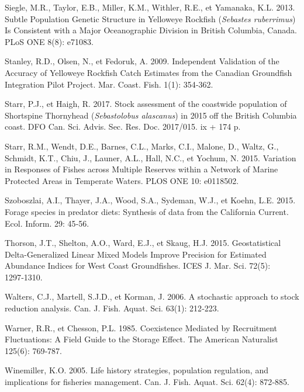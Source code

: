 \documentclass[french,11pt]{book}
\begin{document}
\leavevmode\hypertarget{ref-siegle2013}{}%
Siegle, M.R., Taylor, E.B., Miller, K.M., Withler, R.E., et Yamanaka, K.L. 2013. Subtle Population Genetic Structure in Yelloweye Rockfish (\emph{Sebastes ruberrimus}) Is Consistent with a Major Oceanographic Division in British Columbia, Canada. PLoS ONE 8(8): e71083.

\leavevmode\hypertarget{ref-stanley2009}{}%
Stanley, R.D., Olsen, N., et Fedoruk, A. 2009. Independent Validation of the Accuracy of Yelloweye Rockfish Catch Estimates from the Canadian Groundfish Integration Pilot Project. Mar. Coast. Fish. 1(1): 354‑362.

\leavevmode\hypertarget{ref-starr2017}{}%
Starr, P.J., et Haigh, R. 2017. Stock assessment of the coastwide population of Shortspine Thornyhead (\emph{Sebastolobus alascanus}) in 2015 off the British Columbia coast. DFO Can. Sci. Advis. Sec. Res. Doc. 2017/015. ix + 174 p.

\leavevmode\hypertarget{ref-starr2015}{}%
Starr, R.M., Wendt, D.E., Barnes, C.L., Marks, C.I., Malone, D., Waltz, G., Schmidt, K.T., Chiu, J., Launer, A.L., Hall, N.C., et Yochum, N. 2015. Variation in Responses of Fishes across Multiple Reserves within a Network of Marine Protected Areas in Temperate Waters. PLOS ONE 10: e0118502.

\leavevmode\hypertarget{ref-szoboszlai2015}{}%
Szoboszlai, A.I., Thayer, J.A., Wood, S.A., Sydeman, W.J., et Koehn, L.E. 2015. Forage species in predator diets: Synthesis of data from the California Current. Ecol. Inform. 29: 45‑56.

\leavevmode\hypertarget{ref-thorson2015}{}%
Thorson, J.T., Shelton, A.O., Ward, E.J., et Skaug, H.J. 2015. Geostatistical Delta-Generalized Linear Mixed Models Improve Precision for Estimated Abundance Indices for West Coast Groundfishes. ICES J. Mar. Sci. 72(5): 1297‑1310.

\leavevmode\hypertarget{ref-walters2006}{}%
Walters, C.J., Martell, S.J.D., et Korman, J. 2006. A stochastic approach to stock reduction analysis. Can. J. Fish. Aquat. Sci. 63(1): 212‑223.

\leavevmode\hypertarget{ref-warner1985}{}%
Warner, R.R., et Chesson, P.L. 1985. Coexistence Mediated by Recruitment Fluctuations: A Field Guide to the Storage Effect. The American Naturalist 125(6): 769‑787.

\leavevmode\hypertarget{ref-winemiller2005}{}%
Winemiller, K.O. 2005. Life history strategies, population regulation, and implications for fisheries management. Can. J. Fish. Aquat. Sci. 62(4): 872‑885.
\end{document}
